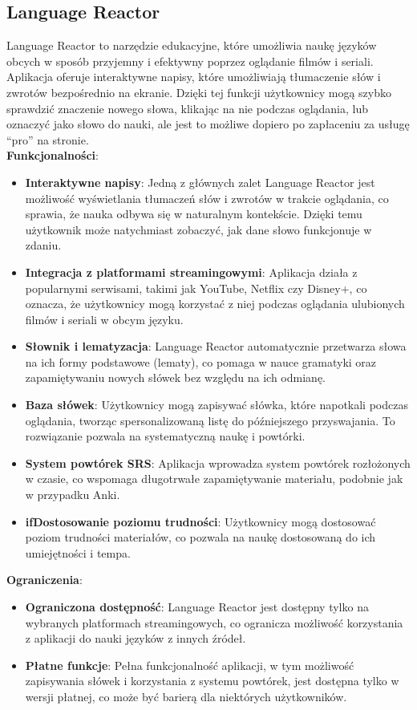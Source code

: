 \subsection{Language Reactor}
Language Reactor to narzędzie edukacyjne, które umożliwia naukę języków obcych w sposób przyjemny i efektywny poprzez oglądanie filmów i seriali. Aplikacja oferuje interaktywne napisy, które umożliwiają tłumaczenie słów i zwrotów bezpośrednio na ekranie. Dzięki tej funkcji użytkownicy mogą szybko sprawdzić znaczenie nowego słowa, klikając na nie podczas oglądania, lub oznaczyć jako słowo do nauki, ale jest to możliwe dopiero po zapłaceniu za usługę “pro” na stronie. \\
\textbf{Funkcjonalności}:
\begin{itemize}
    \item {\textbf{Interaktywne napisy}}: Jedną z głównych zalet Language Reactor jest możliwość wyświetlania tłumaczeń słów i zwrotów w trakcie oglądania, co sprawia, że nauka odbywa się w naturalnym kontekście. Dzięki temu użytkownik może natychmiast zobaczyć, jak dane słowo funkcjonuje w zdaniu.
    \item {\textbf{Integracja z platformami streamingowymi}}: Aplikacja działa z popularnymi serwisami, takimi jak YouTube, Netflix czy Disney+, co oznacza, że użytkownicy mogą korzystać z niej podczas oglądania ulubionych filmów i seriali w obcym języku.
    \item {\textbf{Słownik i lematyzacja}}: Language Reactor automatycznie przetwarza słowa na ich formy podstawowe (lematy), co pomaga w nauce gramatyki oraz zapamiętywaniu nowych słówek bez względu na ich odmianę.
    \item {\textbf{Baza słówek}}: Użytkownicy mogą zapisywać słówka, które napotkali podczas oglądania, tworząc spersonalizowaną listę do późniejszego przyswajania. To rozwiązanie pozwala na systematyczną naukę i powtórki.
    \item {\textbf{System powtórek SRS}}: Aplikacja wprowadza system powtórek rozłożonych w czasie, co wspomaga długotrwałe zapamiętywanie materiału, podobnie jak w przypadku Anki.
    \item {\textbf{ifDostosowanie poziomu trudności}}: Użytkownicy mogą dostosować poziom trudności materiałów, co pozwala na naukę dostosowaną do ich umiejętności i tempa.
\end{itemize}

\textbf{Ograniczenia}:
\begin{itemize}
    \item \textbf{Ograniczona dostępność}: Language Reactor jest dostępny tylko na wybranych platformach streamingowych, co ogranicza możliwość korzystania z aplikacji do nauki języków z innych źródeł.
    \item \textbf{Płatne funkcje}: Pełna funkcjonalność aplikacji, w tym możliwość zapisywania słówek i korzystania z systemu powtórek, jest dostępna tylko w wersji płatnej, co może być barierą dla niektórych użytkowników.
\end{itemize}

